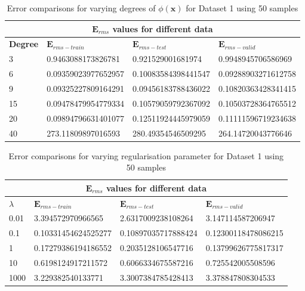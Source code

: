 {
\begin{table}[b]
\begin{tabular}{ |p{1.5cm}|p{3cm}|p{3cm}| p{3cm}|  }
\hline
\multicolumn{4}{|c|}{$\mathbf{E}_{rms}$ values for different data } \\
\hline
\rowcolor{lightgray} \textbf{Degree} & $\mathbf{E}_{rms-train}$ & $\mathbf{E}_{rms-test}$ & $\mathbf{E}_{rms-valid}$ \\
\hline
 3   &   0.9463088173826781  &  0.921529001681974   &  0.9948945706586969   \\   
 \hline
 6   &   0.09359023977652957   &   0.10083584398441547   &   0.09288903271612758         \\
 \hline
 9   &   0.09325227809164291   &    0.09456183788436022        &     0.10820363428341415     \\
 \hline
 15  &   0.09478479954779334    &     0.10579059792367092    &     0.10503728364765512     \\
 \hline
 20  &   0.09894796631401077  &    0.12511924445979059       &     0.11111596719234638      \\
 \hline
 40  &   273.11809897016593     &     280.49354546509295       &       264.14720043776646   \\
\hline
\end{tabular}
\caption{Error comparisons for varying degrees of $\phi(\mathbf{x}) $ for Dataset 1 using 50 samples}
\label{table:1}
\end{table}
}

{
\begin{table}[b]
\begin{tabular}{ |p{1.5cm}|p{3cm}|p{3cm}| p{3cm}|  }
\hline
\multicolumn{4}{|c|}{$\mathbf{E}_{rms}$ values for different data } \\
\hline
\rowcolor{lightgray} $\lambda$ & $\mathbf{E}_{rms-train}$ & $\mathbf{E}_{rms-test}$ & $\mathbf{E}_{rms-valid}$ \\
\hline
 0.01  &  3.394572970966565     &       2.6317009238108264  &   3.147114587206947   \\   
 \hline
 0.1   &    0.10331454624525277   & 0.10897035717888424  & 0.12300118478086215         \\
 \hline
  1   &  0.17279386194186552   &     0.2035128106547716   &    0.13799626775817317   \\
 \hline
 10   &    0.6198124917211572   &     0.6066334675587216   &    0.725542005508596  \\
 \hline
 1000  &   3.229382540133771      &    3.3007384785428413     &     3.378847808304533      \\
\hline
\end{tabular}
\caption{Error comparisons for varying regularisation parameter for Dataset 1 using 50 samples}
\label{table:2}
\end{table}
}

